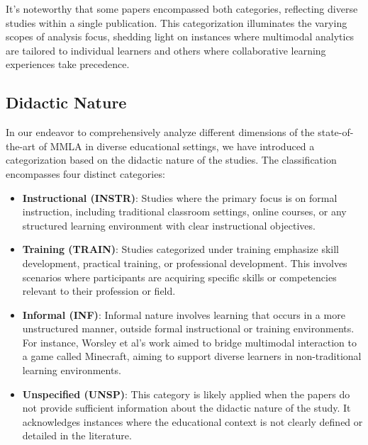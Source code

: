 \documentclass[manuscript,screen,review]{acmart}
\begin{document}
 It's noteworthy that some papers encompassed both categories, reflecting diverse studies within a single publication\cite{1326191931, 3637456466}. This categorization illuminates the varying scopes of analysis focus, shedding light on instances where multimodal analytics are tailored to individual learners and others where collaborative learning experiences take precedence.


\subsection{Didactic Nature} \label{subsec:didactic_nature}

In our endeavor to comprehensively analyze different dimensions of the state-of-the-art of MMLA in diverse educational settings, we have introduced a categorization based on the didactic nature of the studies. The classification encompasses four distinct categories: 

\begin{itemize}
    \item \textbf{Instructional (INSTR)}: Studies where the primary focus is on formal instruction, including traditional classroom settings, online courses, or any structured learning environment with clear instructional objectives.

    \item \textbf{Training (TRAIN)}: Studies categorized under training emphasize skill development, practical training, or professional development. This involves scenarios where participants are acquiring specific skills or competencies relevant to their profession or field.
    
    \item \textbf{Informal (INF)}: Informal nature involves learning that occurs in a more unstructured manner, outside formal instructional or training environments. For instance, Worsley et al's work \cite{666050348} aimed to bridge multimodal interaction to a game called Minecraft, aiming to support diverse learners in non-traditional learning environments. 
    
    \item \textbf{Unspecified (UNSP)}: This category is likely applied when the papers do not provide sufficient information about the didactic nature of the study. It acknowledges instances where the educational context is not clearly defined or detailed in the literature.
\end{itemize}
\end{document}
